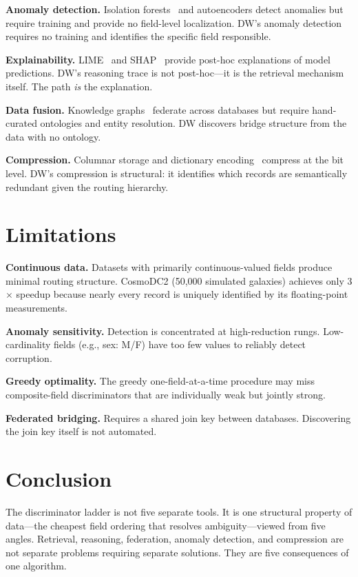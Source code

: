 \documentclass[11pt]{article}
\begin{document}
\textbf{Anomaly detection.} Isolation forests~\cite{liu2008} and autoencoders detect anomalies but require training and provide no field-level localization. DW's anomaly detection requires no training and identifies the specific field responsible.

\textbf{Explainability.} LIME~\cite{ribeiro2016} and SHAP~\cite{lundberg2017} provide post-hoc explanations of model predictions. DW's reasoning trace is not post-hoc---it is the retrieval mechanism itself. The path \textit{is} the explanation.

\textbf{Data fusion.} Knowledge graphs~\cite{hogan2021} federate across databases but require hand-curated ontologies and entity resolution. DW discovers bridge structure from the data with no ontology.

\textbf{Compression.} Columnar storage and dictionary encoding~\cite{abadi2013} compress at the bit level. DW's compression is structural: it identifies which records are semantically redundant given the routing hierarchy.

\section{Limitations}

\textbf{Continuous data.} Datasets with primarily continuous-valued fields produce minimal routing structure. CosmoDC2 (50{,}000 simulated galaxies) achieves only 3$\times$ speedup because nearly every record is uniquely identified by its floating-point measurements.

\textbf{Anomaly sensitivity.} Detection is concentrated at high-reduction rungs. Low-cardinality fields (e.g., sex: M/F) have too few values to reliably detect corruption.

\textbf{Greedy optimality.} The greedy one-field-at-a-time procedure may miss composite-field discriminators that are individually weak but jointly strong.

\textbf{Federated bridging.} Requires a shared join key between databases. Discovering the join key itself is not automated.

\section{Conclusion}

The discriminator ladder is not five separate tools. It is one structural property of data---the cheapest field ordering that resolves ambiguity---viewed from five angles. Retrieval, reasoning, federation, anomaly detection, and compression are not separate problems requiring separate solutions. They are five consequences of one algorithm.
\end{document}
